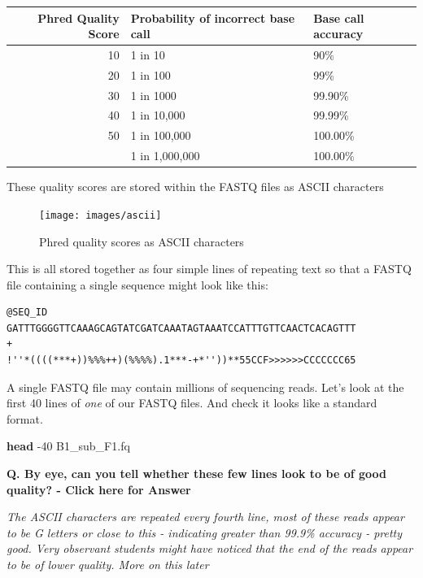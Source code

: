 \documentclass[
]{book}
\newenvironment{Shaded}{\begin{snugshade}}{\end{snugshade}}
\newcommand{\AttributeTok}[1]{\textcolor[rgb]{0.13,0.29,0.53}{#1}}
\newcommand{\FunctionTok}[1]{\textcolor[rgb]{0.13,0.29,0.53}{\textbf{#1}}}
\newcommand{\NormalTok}[1]{#1}
\begin{document}
\begin{longtable}{rll}
\toprule
\textbf{Phred Quality Score} & \textbf{Probability of incorrect base call} & \textbf{Base call accuracy}\\
\midrule
10 & 1 in 10 & 90\%\\
20 & 1 in 100 & 99\%\\
30 & 1 in 1000 & 99.90\%\\
40 & 1 in 10,000 & 99.99\%\\
50 & 1 in 100,000 & 100.00\%\\
\addlinespace
60 & 1 in 1,000,000 & 100.00\%\\
\bottomrule
\end{longtable}

These quality scores are stored within the FASTQ files as ASCII characters

\begin{figure}

{\centering \texttt{[image: images/ascii]} 

}

\caption{Phred quality scores as ASCII characters}\label{fig:unnamed-chunk-40}
\end{figure}

This is all stored together as four simple lines of repeating text so that a FASTQ file containing a single sequence might look like this:

\begin{verbatim}
@SEQ_ID
GATTTGGGGTTCAAAGCAGTATCGATCAAATAGTAAATCCATTTGTTCAACTCACAGTTT
+
!''*((((***+))%%%++)(%%%%).1***-+*''))**55CCF>>>>>>CCCCCCC65
\end{verbatim}

A single FASTQ file may contain millions of sequencing reads. Let's look at the first 40 lines of \emph{one} of our FASTQ files. And check it looks like a standard format.

\begin{Shaded}
\begin{Highlighting}[]
\FunctionTok{head} \AttributeTok{{-}40}\NormalTok{ B1\_sub\_F1.fq}
\end{Highlighting}
\end{Shaded}

\textbf{Q. By eye, can you tell whether these few lines look to be of good quality? - Click here for Answer}

\emph{The ASCII characters are repeated every fourth line, most of these reads appear to be G letters or close to this - indicating greater than 99.9\% accuracy - pretty good. Very observant students might have noticed that the end of the reads appear to be of lower quality. More on this later}
\end{document}
